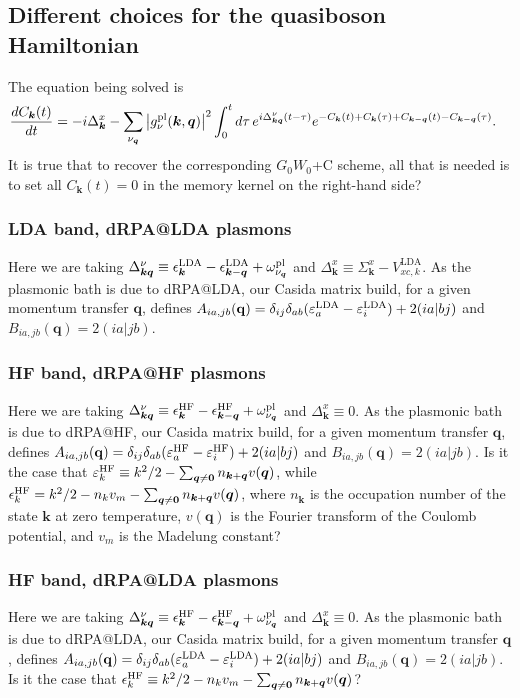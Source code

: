 \subsection{Different choices for the quasiboson Hamiltonian}
The equation being solved is 
\begin{align}
\frac{dC_{\bm{k}}(t)}{dt}
&=
-i\Delta_{\bm{k}}^x
-
\sum_{\nu_{\bm q}}
\left|g_\nu^{\rm pl}(\bm{k},\bm q)\right|^2
\int_0^t d\tau\,
e^{i\Delta_{\bm{k}\bm q}^{\nu}(t-\tau)}
e^{
-C_{\bm{k}}(t)+C_{\bm{k}}(\tau)
+C_{\bm{k}-\bm q}(t)-C_{\bm{k}-\bm q}(\tau)
}.
\end{align}
It is true that to recover the corresponding $G_0W_0$+C scheme, all that is needed is to set all $C_{\bm{k}}(t)=0$ in the memory kernel on the right-hand side?
\subsubsection{LDA band, dRPA@LDA plasmons}
Here we are taking $\Delta_{\bm{k}\bm q}^{\nu}
\equiv
\epsilon_{\bm{k}}^{\rm LDA}
-\epsilon_{\bm{k}-\bm q}^{\rm LDA}
+\omega_{\nu_{\bm q}}^{\rm pl}$ and $\Delta_{\bm{k}}^x\equiv \Sigma_{\bm{k}}^x-V_{x c, k}^{\mathrm{LDA}}$. As the plasmonic bath is due to dRPA@LDA, our Casida matrix build, for a given momentum transfer $\mathbf{q}$, defines $A_{ia,jb}(\mathbf{q}) = \delta_{ij} \delta_{ab} (\varepsilon_a^{\rm LDA} - \varepsilon_i^{\rm LDA}) + 2 (ia|bj)$ and $B_{ia,jb}(\mathbf{q}) = 2 (ia|jb)$.
\subsubsection{HF band, dRPA@HF plasmons}
Here we are taking $\Delta_{\bm{k}\bm q}^{\nu}
\equiv
\epsilon_{\bm{k}}^{\rm HF}
-\epsilon_{\bm{k}-\bm q}^{\rm HF}
+\omega_{\nu_{\bm q}}^{\rm pl}$ and $\Delta_{\bm{k}}^x\equiv 0$. As the plasmonic bath is due to dRPA@HF, our Casida matrix build, for a given momentum transfer $\mathbf{q}$, defines $A_{ia,jb}(\mathbf{q}) = \delta_{ij} \delta_{ab} (\varepsilon_a^{\rm HF} - \varepsilon_i^{\rm HF}) + 2 (ia|bj)$ and $B_{ia,jb}(\mathbf{q}) = 2 (ia|jb)$. Is it the case that $\varepsilon_k^{\rm HF}\equiv k^2/2 -\sum_{\bm{q}\neq\bm{0}} n_{\bm{k}+\bm{q}} v(\bm{q})$, while $\epsilon_k^{\rm HF} = k^2/2 - n_{k}v_m-\sum_{\bm{q}\neq\bm{0}} n_{\bm{k}+\bm{q}}v(\bm{q})$, where $n_{\bm{k}}$ is the occupation number of the state $\bm{k}$ at zero temperature, $v(\bm{q})$ is the Fourier transform of the Coulomb potential, and $v_m$ is the Madelung constant? 
\subsubsection{HF band, dRPA@LDA plasmons}
Here we are taking $\Delta_{\bm{k}\bm q}^{\nu}
\equiv
\epsilon_{\bm{k}}^{\rm HF}
-\epsilon_{\bm{k}-\bm q}^{\rm HF}
+\omega_{\nu_{\bm q}}^{\rm pl}$ and $\Delta_{\bm{k}}^x\equiv 0$. As the plasmonic bath is due to dRPA@LDA, our Casida matrix build, for a given momentum transfer $\mathbf{q}$, defines $A_{ia,jb}(\mathbf{q}) = \delta_{ij} \delta_{ab} (\varepsilon_a^{\rm LDA} - \varepsilon_i^{\rm LDA}) + 2 (ia|bj)$ and $B_{ia,jb}(\mathbf{q}) = 2 (ia|jb)$. Is it the case that $\epsilon_k^{\rm HF}\equiv k^2/2 -n_{k}v_m-\sum_{\bm{q}\neq\bm{0}} n_{\bm{k}+\bm{q}} v(\bm{q})$?
